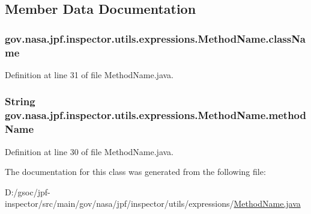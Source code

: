 \subsection{Member Data Documentation}
\subsubsection[{\texorpdfstring{class\+Name}{className}}]{ gov.\+nasa.\+jpf.\+inspector.\+utils.\+expressions.\+Method\+Name.\+class\+Name\hspace{0.3cm}{\ttfamily [private]}}\hypertarget{classgov_1_1nasa_1_1jpf_1_1inspector_1_1utils_1_1expressions_1_1_method_name_a1946a1f60b1c2031ac340a54a560a849}{}\label{classgov_1_1nasa_1_1jpf_1_1inspector_1_1utils_1_1expressions_1_1_method_name_a1946a1f60b1c2031ac340a54a560a849}


Definition at line 31 of file Method\+Name.\+java.

\subsubsection[{\texorpdfstring{method\+Name}{methodName}}]{\setlength{\rightskip}{0pt plus 5cm}String gov.\+nasa.\+jpf.\+inspector.\+utils.\+expressions.\+Method\+Name.\+method\+Name\hspace{0.3cm}{\ttfamily [private]}}\hypertarget{classgov_1_1nasa_1_1jpf_1_1inspector_1_1utils_1_1expressions_1_1_method_name_a2a429c9d89bbdbdad12c6cb553ff5d55}{}\label{classgov_1_1nasa_1_1jpf_1_1inspector_1_1utils_1_1expressions_1_1_method_name_a2a429c9d89bbdbdad12c6cb553ff5d55}


Definition at line 30 of file Method\+Name.\+java.



The documentation for this class was generated from the following file\+:\begin{DoxyCompactItemize}
\item 
D\+:/gsoc/jpf-\/inspector/src/main/gov/nasa/jpf/inspector/utils/expressions/\hyperlink{_method_name_8java}{Method\+Name.\+java}\end{DoxyCompactItemize}
